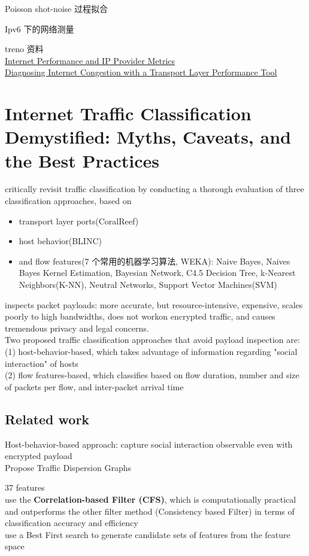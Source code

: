 \documentclass{article}
\begin{document}
Poisson shot-noise 过程拟合

Ipv6 下的网络测量

treno 资料\\\href{http://staff.psc.edu/mathis/ippm/}{Internet
Performance and IP Provider
Metrics}\\\href{http://staff.psc.edu/mathis/papers/inet96.treno.html}{Diagnosing
Internet Congestion with a Transport Layer Performance Tool}

\section{Internet Traffic Classification Demystified: Myths, Caveats, and the Best Practices}
critically revisit traffic classification by conducting a thorough evaluation of three classification approaches, based on
\begin{itemize}
\item transport layer ports(CoralReef)
\item host behavior(BLINC)
\item and flow features(7 个常用的机器学习算法, WEKA): Naive Bayes, Naives Bayes Kernel Estimation, Bayesian Network, C4.5 Decision Tree, k-Nearest Neighbors(K-NN), Neutral Networks, Support Vector Machines(SVM)
\end{itemize}

inspects packet payloads: more accurate, but resource-intensive, expensive, scales poorly to high bandwidths, does not workon encrypted traffic, and causes tremendous privacy and legal concerns. \\
Two proposed traffic classification approaches that avoid payload inspection are:\\
(1) host-behavior-based, which takes advantage of information regarding "social interaction" of hosts\\
(2) flow features-based, which classifies based on flow duration, number and size of packets per flow, and inter-packet arrival time

\subsection{Related work}
Host-behavior-based approach: capture social interaction observable even with encrypted payload\\
Propose Traffic Dispersion Graphs

37 features\\
use the \textbf{Correlation-based Filter (CFS)}, which is computationally practical 
and outperforms the other filter method (Consistency based Filter) in terms of classification accuracy and efficiency \\
use a Best First search to generate candidate sets of features from the feature space
\end{document}

